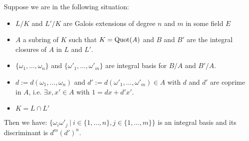 \begin{Prop}
Suppose we are in the following situation:
\begin{itemize}
\item $L/K$ and $L'/K$ are Galois extensions of degree $n$ and $m$ in some field $E$
\item $A$ a subring of $K$ such that $K=\operatorname{Quot}(A)$ and $B$ and $B'$ are the integral closures of $A$ in $L$ and $L'$.
\item $\{\omega_1, \dots, \omega_n\}$ and $\{\omega'_1, \dots, \omega'_m\}$ are integral basis for $B/A$ and $B'/A$.
\item $d:=d(\omega_1, \dots, \omega_n)$ and $d':=d(\omega'_1, \dots, \omega'_m) \in A$ with $d$ and $d'$ are coprime in $A$, i.e. $\exists x, x' \in A$ with $1=dx+d'x'$.
\item $K=L \cap L'$
\end{itemize}
Then we have: $\{\omega_i \omega'_j \ | \ i \in \{1, \dots, n \}, j \in \{1, \dots, m \}\}$ is an integral basis and its discriminant  is $d^m (d')^n$.
\end{Prop}

